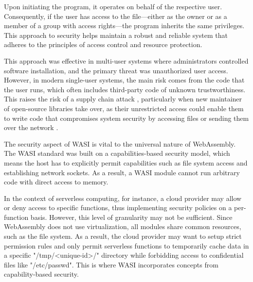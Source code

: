 Upon initiating the program, it operates on behalf of the respective user. Consequently, if the user has access to the file—either as the owner or as a member of a group with access rights—the program inherits the same privileges. This approach to security helps maintain a robust and reliable system that adheres to the principles of access control and resource protection.

This approach was effective in multi-user systems where administrators controlled software installation, and the primary threat was unauthorized user access. However, in modern single-user systems, the main risk comes from the code that the user runs, which often includes third-party code of unknown trustworthiness. This raises the risk of a supply chain attack \cite{sletten_2021_webassembly}, particularly when new maintainer of open-source libraries take over, as their unrestricted access could enable them to write code that compromises system security by accessing files or sending them over the network \cite{clark_2019_standardising}.

The security aspect of WASI is vital to the universal nature of WebAssembly. The WASI standard was built on a capabilities-based security model, which means the host has to explicitly permit capabilities such as file system access and establishing network sockets. As a result, a WASI module cannot run arbitrary code with direct access to memory.

In the context of \gls{serverless} computing, for instance, a cloud provider may allow or deny access to specific functions, thus implementing security policies on a per-function basis. However, this level of granularity may not be sufficient. Since WebAssembly does not use virtualization, all modules share common resources, such as the file system. As a result, the cloud provider may want to setup strict permission rules and only permit serverless functions to temporarily cache data in a specific "/tmp/<unique-id>/" directory while forbidding access to confidential files like "/etc/passwd". This is where WASI incorporates concepts from capability-based security.
